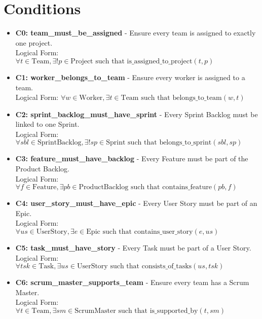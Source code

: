 \documentclass[11pt]{article}
\begin{document}
\section{Conditions}
\begin{itemize}
    \item \textbf{C0: team\_must\_be\_assigned} - Ensure every team is assigned to exactly one project.
    \\Logical Form: $\forall t \in \text{Team}, \exists! p \in \text{Project} \text{ such that } \text{is\_assigned\_to\_project}(t, p)$
    
    \item \textbf{C1: worker\_belongs\_to\_team} - Ensure every worker is assigned to a team.
    \\Logical Form: $\forall w \in \text{Worker}, \exists t \in \text{Team} \text{ such that } \text{belongs\_to\_team}(w, t)$
    
    \item \textbf{C2: sprint\_backlog\_must\_have\_sprint} - Every Sprint Backlog must be linked to one Sprint.
    \\Logical Form: $\forall sbl \in \text{SprintBacklog}, \exists! sp \in \text{Sprint} \text{ such that } \text{belongs\_to\_sprint}(sbl, sp)$
    
    \item \textbf{C3: feature\_must\_have\_backlog} - Every Feature must be part of the Product Backlog.
    \\Logical Form: $\forall f \in \text{Feature}, \exists pb \in \text{ProductBacklog} \text{ such that } \text{contains\_feature}(pb, f)$
    
    \item \textbf{C4: user\_story\_must\_have\_epic} - Every User Story must be part of an Epic.
    \\Logical Form: $\forall us \in \text{UserStory}, \exists e \in \text{Epic} \text{ such that } \text{contains\_user\_story}(e, us)$
    
    \item \textbf{C5: task\_must\_have\_story} - Every Task must be part of a User Story.
    \\Logical Form: $\forall tsk \in \text{Task}, \exists us \in \text{UserStory} \text{ such that } \text{consists\_of\_tasks}(us, tsk)$
    
    \item \textbf{C6: scrum\_master\_supports\_team} - Ensure every team has a Scrum Master.
    \\Logical Form: $\forall t \in \text{Team}, \exists sm \in \text{ScrumMaster} \text{ such that } \text{is\_supported\_by}(t, sm)$
    

\end{itemize}
\end{document}
